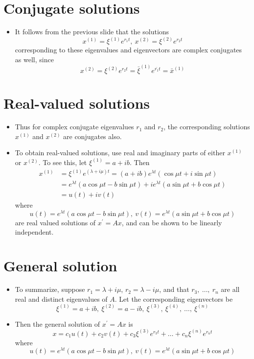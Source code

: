 \documentclass[11pt,a4paper]{article}
\begin{document}
	\section*{Conjugate solutions}
	\begin{itemize}
		\item It follows from the previous slide that the solutions
		$$
		x^{(1)} = \xi^{(1)}e^{r_1t},\ x^{(2)} = \xi^{(2)}e^{r_2t}
		$$
		corresponding to these eigenvalues and eigenvectors are complex conjugates as well, since
		$$
		x^{(2)} = \xi^{(2)}e^{r_2t} = \bar{\xi}^{(1)}e^{\bar{r_1}t}=\bar{x}^{(1)}
		$$
	\end{itemize}
	\section*{Real-valued solutions}
	\begin{itemize}
		\item Thus for complex conjugate eigenvalues $r_1$ and $r_2$, the corresponding solutions $x^{(1)}$ and $x^{(2)}$ are conjugates also.
		\item To obtain real-valued solutions, use real and imaginary parts of either $x^{(1)}$ or $x^{(2)}$. To see this, let $\xi^{(1)} = a+ib$. Then
		\begin{align*}
			x^{(1)} &= \xi^{(1)}e^{(\lambda + i\mu)t} = (a+ib)e^{\lambda t}(\cos \mu t + i\sin \mu t)\\
			&= e^{\lambda t}(a\cos \mu t - b\sin \mu t) + ie^{\lambda t}(a\sin \mu t + b\cos \mu t)\\
			&= u(t) + iv(t)
		\end{align*}
		where
		$$
		u(t) = e^{\lambda t}(a\cos \mu t - b\sin \mu t),\ v(t)=e^{\lambda t}(a\sin \mu t + b\cos \mu t)
		$$
		are real valued solutions of $x^\prime = Ax$, and can be shown to be linearly independent.
	\end{itemize}
	\section*{General solution}
	\begin{itemize}
		\item To summarize, suppose $r_1 = \lambda + i\mu$, $r_2 = \lambda - i\mu$, and that $r_3,\ \ldots,\ r_n$ are all real and distinct eigenvalues of $A$. Let the corresponding eigenvectors be
		$$
		\xi^{(1)} = a+ib,\ \xi^{(2)} = a-ib,\ \xi^{(3)},\ \xi^{(4)},\ \ldots,\ \xi^{(n)}
		$$
		\item Then the general solution of $x^\prime = Ax$ is 
		$$
		x = c_1u(t) + c_2v(t) + c_3\xi^{(3)}e^{r_3t} + \ldots + c_n\xi^{(n)}e^{r_nt}
		$$
		where
		$$
		u(t) = e^{\lambda t}(a\cos \mu t - b\sin \mu t),\ v(t) = e^{\lambda t}(a\sin \mu t + b \cos \mu t)
		$$
	\end{itemize}
\end{document}
